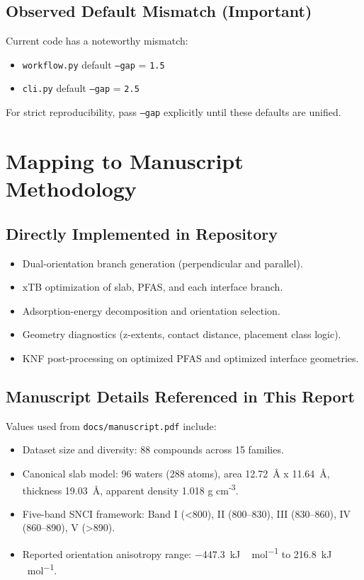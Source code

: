 ﻿\documentclass[11pt]{article}
\begin{document}
\subsection{Observed Default Mismatch (Important)}
Current code has a noteworthy mismatch:
\begin{itemize}[leftmargin=1.5em]
\item \texttt{workflow.py} default \texttt{--gap} = \texttt{1.5}
\item \texttt{cli.py} default \texttt{--gap} = \texttt{2.5}
\end{itemize}
For strict reproducibility, pass \texttt{--gap} explicitly until these defaults are unified.

\section{Mapping to Manuscript Methodology}
\subsection{Directly Implemented in Repository}
\begin{itemize}[leftmargin=1.5em]
\item Dual-orientation branch generation (perpendicular and parallel).
\item xTB optimization of slab, PFAS, and each interface branch.
\item Adsorption-energy decomposition and orientation selection.
\item Geometry diagnostics (z-extents, contact distance, placement class logic).
\item KNF post-processing on optimized PFAS and optimized interface geometries.
\end{itemize}

\subsection{Manuscript Details Referenced in This Report}
Values used from \texttt{docs/manuscript.pdf} include:
\begin{itemize}[leftmargin=1.5em]
\item Dataset size and diversity: 88 compounds across 15 families.
\item Canonical slab model: 96 waters (288 atoms), area \SI{12.72}{\angstrom} x \SI{11.64}{\angstrom}, thickness \SI{19.03}{\angstrom}, apparent density 1.018 g cm\textsuperscript{-3}.
\item Five-band SNCI framework: Band I (<800), II (800--830), III (830--860), IV (860--890), V (>890).
\item Reported orientation anisotropy range: \SI{-447.3}{kJ\,mol^{-1}} to \SI{216.8}{kJ\,mol^{-1}}.
\end{itemize}
\end{document}

